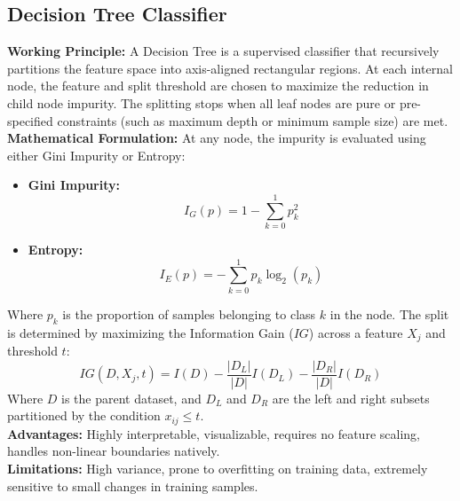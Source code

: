 \documentclass[12pt,a4paper]{article}
\begin{document}
\subsection{Decision Tree Classifier}
\textbf{Working Principle:} A Decision Tree is a supervised classifier that recursively partitions the feature space into axis-aligned rectangular regions. At each internal node, the feature and split threshold are chosen to maximize the reduction in child node impurity. The splitting stops when all leaf nodes are pure or pre-specified constraints (such as maximum depth or minimum sample size) are met.\\
\textbf{Mathematical Formulation:}
At any node, the impurity is evaluated using either Gini Impurity or Entropy:
\begin{itemize}
    \item \textbf{Gini Impurity:}
    \begin{equation}
        I_G(p) = 1 - \sum_{k=0}^1 p_k^2
    \end{equation}
    \item \textbf{Entropy:}
    \begin{equation}
        I_E(p) = -\sum_{k=0}^1 p_k \log_2(p_k)
    \end{equation}
\end{itemize}
Where $p_k$ is the proportion of samples belonging to class $k$ in the node. The split is determined by maximizing the Information Gain ($IG$) across a feature $X_j$ and threshold $t$:
\begin{equation}
    IG(D, X_j, t) = I(D) - \frac{|D_L|}{|D|} I(D_L) - \frac{|D_R|}{|D|} I(D_R)
\end{equation}
Where $D$ is the parent dataset, and $D_L$ and $D_R$ are the left and right subsets partitioned by the condition $x_{ij} \le t$.\\
\textbf{Advantages:} Highly interpretable, visualizable, requires no feature scaling, handles non-linear boundaries natively.\\
\textbf{Limitations:} High variance, prone to overfitting on training data, extremely sensitive to small changes in training samples.
\end{document}
